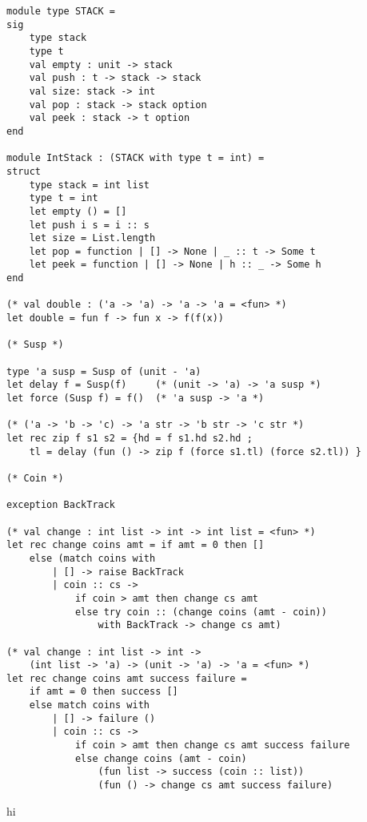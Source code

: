 \documentclass[12pt]{article}
\begin{document}
\begin{multicols}{2}

\begin{lstlisting}
module type STACK =
sig
    type stack
    type t
    val empty : unit -> stack
    val push : t -> stack -> stack
    val size: stack -> int
    val pop : stack -> stack option
    val peek : stack -> t option
end

module IntStack : (STACK with type t = int) =
struct
    type stack = int list
    type t = int
    let empty () = []
    let push i s = i :: s
    let size = List.length
    let pop = function | [] -> None | _ :: t -> Some t
    let peek = function | [] -> None | h :: _ -> Some h
end

(* val double : ('a -> 'a) -> 'a -> 'a = <fun> *)
let double = fun f -> fun x -> f(f(x))

(* Susp *)

type 'a susp = Susp of (unit - 'a)
let delay f = Susp(f)     (* (unit -> 'a) -> 'a susp *)
let force (Susp f) = f()  (* 'a susp -> 'a *)

(* ('a -> 'b -> 'c) -> 'a str -> 'b str -> 'c str *)
let rec zip f s1 s2 = {hd = f s1.hd s2.hd ; 
    tl = delay (fun () -> zip f (force s1.tl) (force s2.tl)) }

(* Coin *)

exception BackTrack

(* val change : int list -> int -> int list = <fun> *)
let rec change coins amt = if amt = 0 then []
    else (match coins with 
        | [] -> raise BackTrack
        | coin :: cs ->
            if coin > amt then change cs amt
            else try coin :: (change coins (amt - coin)) 
                with BackTrack -> change cs amt)

(* val change : int list -> int -> 
    (int list -> 'a) -> (unit -> 'a) -> 'a = <fun> *)
let rec change coins amt success failure = 
    if amt = 0 then success []
    else match coins with
        | [] -> failure ()
        | coin :: cs -> 
            if coin > amt then change cs amt success failure
            else change coins (amt - coin)
                (fun list -> success (coin :: list))
                (fun () -> change cs amt success failure)

\end{lstlisting}

\columnbreak

hi

\end{multicols}
\end{document}
